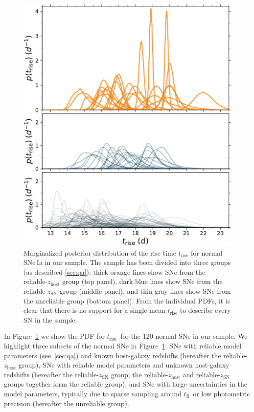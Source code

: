 \documentclass[twocolumn]{./aastex63}
\newcommand{\tfl}{$t_\mathrm{fl}$}
\newcommand{\trise}{$t_\mathrm{rise}$}
\begin{document}
\begin{figure}
    \centering
    \includegraphics[width=1\linewidth]{./figures/rise_time.pdf}
    \caption{Marginalized posterior distribution of the rise time
    $t_\mathrm{rise}$ for normal SNe\,Ia in our sample. The sample has been
    divided into three groups (as described \ref{sec:qa}): thick
    orange lines show SNe from the reliable-$z_\mathrm{host}$ group (top
    panel), dark blue lines show SNe from the reliable-$z_\mathrm{SN}$ group
    (middle panel), and thin gray lines show SNe from the unreliable group
    (bottom panel). From the individual PDFs, it is clear that there is no
    support for a single mean $t_\mathrm{rise}$ to describe every SN in the
    sample.}
    \label{fig:rise_time}
\end{figure}

In Figure~\ref{fig:rise_time} we show the PDF for \trise\ for the 120 normal
SNe in our sample. We highlight three subsets of the normal SNe in
Figure~\ref{fig:rise_time}: SNe with reliable model parameters
(see~\ref{sec:qa}) and known host-galaxy redshifts (hereafter the
reliable-$z_\mathrm{host}$ group), SNe with reliable model parameters and
unknown host-galaxy redshifts (hereafter the reliable-$z_\mathrm{SN}$ group;
the reliable-$z_\mathrm{host}$ and reliable-$z_\mathrm{SN}$ groups together
form the reliable group), and SNe with large uncertainties in the model
parameters, typically due to sparse sampling around \tfl\ or low photometric
precision (hereafter the unreliable group).
\end{document}
